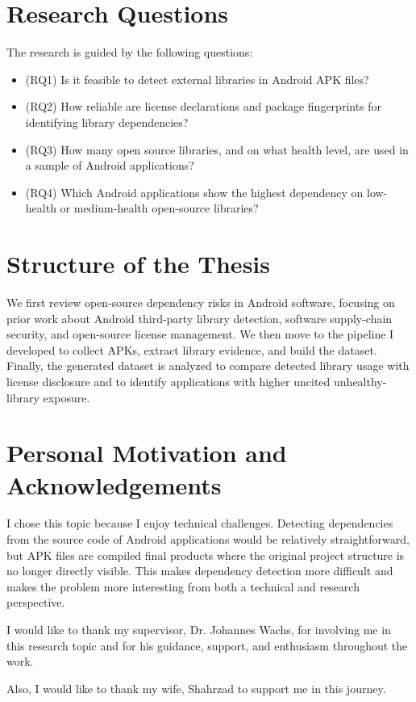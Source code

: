 \documentclass[12pt,a4paper]{report}
\begin{document}
\section{Research Questions}
The research is guided by the following questions:
\begin{itemize}
\item (RQ1) Is it feasible to detect external libraries in Android APK files?
\item (RQ2) How reliable are license declarations and package fingerprints for identifying library dependencies?
\item (RQ3) How many open source libraries, and on what health level, are used in a sample of Android applications?
\item (RQ4) Which Android applications show the highest dependency on low-health or medium-health open-source libraries?
\end{itemize}

\section{Structure of the Thesis}
We first review open-source dependency risks in Android software, focusing on prior work about Android third-party library detection, software supply-chain security, and open-source license management. We then move to the pipeline I developed to collect APKs, extract library evidence, and build the dataset. Finally, the generated dataset is analyzed to compare detected library usage with license disclosure and to identify applications with higher uncited unhealthy-library exposure.

\section{Personal Motivation and Acknowledgements}
I chose this topic because I enjoy technical challenges. Detecting dependencies from the source code of Android applications would be relatively straightforward, but APK files are compiled final products where the original project structure is no longer directly visible. This makes dependency detection more difficult and makes the problem more interesting from both a technical and research perspective.

I would like to thank my supervisor, Dr. Johannes Wachs, for involving me in this research topic and for his guidance, support, and enthusiasm throughout the work.

Also, I would like to thank my wife, Shahrzad to support me in this journey.
\end{document}
